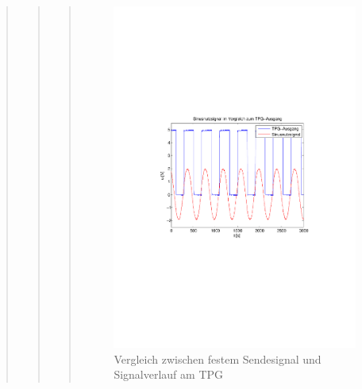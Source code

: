 \begin{quote}
\begin{quote}
\begin{quote}
             \begin{figure}[H] \centering
                    \includegraphics[scale=0.5, trim = 2cm 6.5cm 1.5cm 8.5cm,
                    clip]{./Bilder/sin_vs_tpg}
                        \caption{Vergleich zwischen festem Sendesignal und
                        Signalverlauf am TPG}
                \end{figure}
           
           
           

\end{quote}
\end{quote}
\end{quote}
